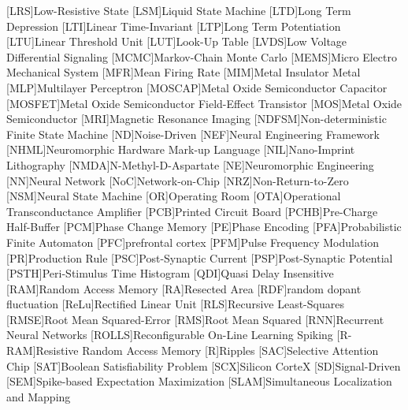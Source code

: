 [LRS]{Low-Resistive State}
[LSM]{Liquid State Machine}
[LTD]{Long Term Depression}
[LTI]{Linear Time-Invariant}
[LTP]{Long Term Potentiation}
[LTU]{Linear Threshold Unit}
[LUT]{Look-Up Table}
[LVDS]{Low Voltage Differential Signaling}
[MCMC]{Markov-Chain Monte Carlo}
[MEMS]{Micro Electro Mechanical System}
[MFR]{Mean Firing Rate}
[MIM]{Metal Insulator Metal}
[MLP]{Multilayer Perceptron}
[MOSCAP]{Metal Oxide Semiconductor Capacitor}
[MOSFET]{Metal Oxide Semiconductor Field-Effect Transistor}
[MOS]{Metal Oxide Semiconductor}
[MRI]{Magnetic Resonance Imaging}
[NDFSM]{Non-deterministic Finite State Machine} 
[ND]{Noise-Driven}
[NEF]{Neural Engineering Framework}
[NHML]{Neuromorphic Hardware Mark-up Language}
[NIL]{Nano-Imprint Lithography}
[NMDA]{N-Methyl-D-Aspartate}
[NE]{Neuromorphic Engineering}
[NN]{Neural Network}
[NoC]{Network-on-Chip}
[NRZ]{Non-Return-to-Zero}
[NSM]{Neural State Machine}
[OR]{Operating Room}
[OTA]{Operational Transconductance Amplifier}
[PCB]{Printed Circuit Board}
[PCHB]{Pre-Charge Half-Buffer}
[PCM]{Phase Change Memory}
[PE]{Phase Encoding}
[PFA]{Probabilistic Finite Automaton}
[PFC]{prefrontal cortex}
[PFM]{Pulse Frequency Modulation}
[PR]{Production Rule}
[PSC]{Post-Synaptic Current}
[PSP]{Post-Synaptic Potential}
[PSTH]{Peri-Stimulus Time Histogram}
[QDI]{Quasi Delay Insensitive}
[RAM]{Random Access Memory}
[RA]{Resected Area}
[RDF]{random dopant fluctuation}
[ReLu]{Rectified Linear Unit}
[RLS]{Recursive Least-Squares}
[RMSE]{Root Mean Squared-Error}
[RMS]{Root Mean Squared}
[RNN]{Recurrent Neural Networks}
[ROLLS]{Reconfigurable On-Line Learning Spiking}
[R-RAM]{Resistive Random Access Memory}
[R]{Ripples}
[SAC]{Selective Attention Chip}
[SAT]{Boolean Satisfiability Problem}
[SCX]{Silicon CorteX}
[SD]{Signal-Driven}
[SEM]{Spike-based Expectation Maximization}
[SLAM]{Simultaneous Localization and Mapping}
